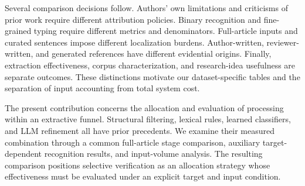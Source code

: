 Several comparison decisions follow. Authors' own limitations and criticisms of prior work require
different attribution policies. Binary recognition and fine-grained typing require different
metrics and denominators. Full-article inputs and curated sentences impose different localization
burdens. Author-written, reviewer-written, and generated references have different evidential
origins. Finally, extraction effectiveness, corpus characterization, and research-idea usefulness
are separate outcomes. These distinctions motivate our dataset-specific tables and the separation
of input accounting from total system cost.

The present contribution concerns the allocation and evaluation of processing within an extractive
funnel. Structural filtering, lexical rules, learned classifiers, and LLM refinement all have prior
precedents. We examine their measured combination through a common full-article stage comparison,
auxiliary target-dependent recognition results, and input-volume analysis. The resulting comparison positions selective verification as an allocation strategy whose
effectiveness must be evaluated under an explicit target and input condition.


